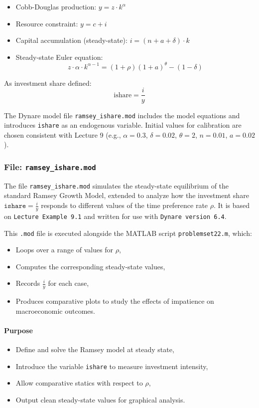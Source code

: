 \documentclass[12pt,a4paper,notitlepage]{article}
\numberwithin{equation}{section}
\begin{document}
\begin{itemize}
\begin{itemize}
    \item Cobb-Douglas production: $y = z \cdot k^\alpha$
    \item Resource constraint: $y = c + i$
    \item Capital accumulation (steady-state): $i = (n + a + \delta) \cdot k$
    \item Steady-state Euler equation:
    \[
    z \cdot \alpha \cdot k^{\alpha - 1} = (1 + \rho)(1 + a)^\theta - (1 - \delta)
    \]
\end{itemize}

As investment share defined:
\[
\text{ishare} = \frac{i}{y}
\]

The Dynare model file \texttt{ramsey\_ishare.mod} includes the model equations and introduces \texttt{ishare} as an endogenous variable. Initial values for calibration are chosen consistent with Lecture 9 (e.g., $\alpha = 0.3$, $\delta = 0.02$, $\theta = 2$, $n = 0.01$, $a = 0.02$).


  \subsubsection {   File: \texttt{ramsey\_ishare.mod}}

The file \texttt{ramsey\_ishare.mod} simulates the steady-state equilibrium of the standard Ramsey Growth Model, extended to analyze how the investment share \( \texttt{ishare} = \frac{i}{y} \) responds to different values of the time preference rate \( \rho \). It is based on \texttt{Lecture Example 9.1} and written for use with \texttt{Dynare version 6.4}.

\vspace{1em}
This \texttt{.mod} file is executed alongside the MATLAB script \texttt{problemset22.m}, which:
\begin{itemize}
  \item Loops over a range of values for \( \rho \),
  \item Computes the corresponding steady-state values,
  \item Records \( \frac{i}{y} \) for each case,
  \item Produces comparative plots to study the effects of impatience on macroeconomic outcomes.
\end{itemize}

\paragraph{Purpose}
\begin{itemize}
  \item Define and solve the Ramsey model at steady state,
  \item Introduce the variable \texttt{ishare} to measure investment intensity,
  \item Allow comparative statics with respect to \( \rho \),
  \item Output clean steady-state values for graphical analysis.
\end{itemize}


\end{itemize}
\end{document}
